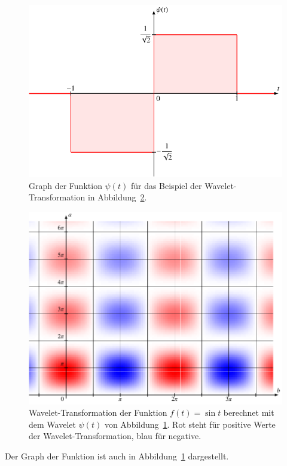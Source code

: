 \begin{beispiel}
\begin{figure}
\centering
\includegraphics{chapters/4-cwt/images/psigraph.pdf}
\caption{Graph der Funktion $\psi(t)$ für das Beispiel der
Wavelet-Transformation in Abbildung~\ref{cwt:psi-cwt}.
\label{cwt:psi-graph}}
\end{figure}
\begin{figure}
\centering
\includegraphics[width=\hsize]{chapters/4-cwt/images/psisin.pdf}
\caption{Wavelet-Transformation der Funktion $f(t)=\sin t$ berechnet
mit dem Wavelet $\psi(t)$ von Abbildung~\ref{cwt:psi-graph}.
Rot steht für positive Werte der Wavelet-Transformation, blau für negative.
\label{cwt:psi-cwt}}
\end{figure}
Der Graph der Funktion ist auch in Abbildung~\ref{cwt:psi-graph} dargestellt.

\end{beispiel}
